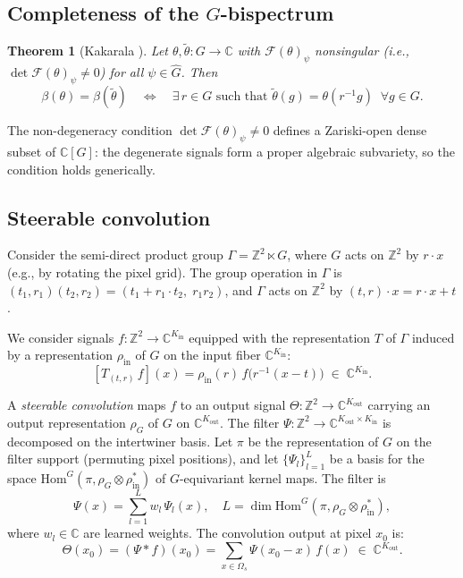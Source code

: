 \documentclass{article}
\newtheorem{theorem}{Theorem}[section]
\theoremstyle{definition}
\theoremstyle{remark}
\newcommand{\FF}{\mathcal{F}}
\newcommand{\C}{\mathbb{C}}
\newcommand{\Z}{\mathbb{Z}}
\newcommand{\Ghat}{\widehat{G}}
\newcommand{\Hom}{\mathrm{Hom}}
\begin{document}
\subsection{Completeness of the $G$-bispectrum}

\begin{theorem}[Kakarala \cite{kakarala2009}]\label{thm:completeness_prelim}
Let $\theta, \tilde{\theta} : G \to \C$ with $\FF(\theta)_\psi$ nonsingular (i.e., $\det \FF(\theta)_\psi \neq 0$) for all $\psi \in \Ghat$. Then
\[
\beta(\theta) = \beta(\tilde{\theta})
\quad\Longleftrightarrow\quad
\exists\, r \in G \text{ such that } \tilde{\theta}(g) = \theta(r^{-1}g) \;\;\forall g \in G.
\]
\end{theorem}

The non-degeneracy condition $\det \FF(\theta)_\psi \neq 0$ defines a Zariski-open dense subset of $\C[G]$: the degenerate signals form a proper algebraic subvariety, so the condition holds generically.

\subsection{Steerable convolution}\label{sec:steerable_conv}

Consider the semi-direct product group $\Gamma = \Z^2 \ltimes G$, where $G$ acts on $\Z^2$ by $r \cdot x$ (e.g., by rotating the pixel grid). The group operation in $\Gamma$ is $(t_1, r_1)(t_2, r_2) = (t_1 + r_1 \cdot t_2,\; r_1 r_2)$, and $\Gamma$ acts on $\Z^2$ by $(t, r) \cdot x = r \cdot x + t$.

We consider signals $f : \Z^2 \to \C^{K_{\mathrm{in}}}$ equipped with the representation $T$ of $\Gamma$ induced by a representation $\rho_{\mathrm{in}}$ of $G$ on the input fiber $\C^{K_{\mathrm{in}}}$:
\begin{equation}\label{eq:induced_action}
[T_{(t,r)}\, f](x) = \rho_{\mathrm{in}}(r)\, f\bigl(r^{-1}(x - t)\bigr) \;\in\; \C^{K_{\mathrm{in}}}.
\end{equation}

A \textit{steerable convolution} maps $f$ to an output signal $\Theta : \Z^2 \to \C^{K_{\mathrm{out}}}$ carrying an output representation $\rho_G$ of $G$ on $\C^{K_{\mathrm{out}}}$. The filter $\Psi : \Z^2 \to \C^{K_{\mathrm{out}} \times K_{\mathrm{in}}}$ is decomposed on the intertwiner basis. Let $\pi$ be the representation of $G$ on the filter support (permuting pixel positions), and let $\{\Psi_l\}_{l=1}^L$ be a basis for the space $\Hom^G(\pi, \rho_G \otimes \rho_{\mathrm{in}}^*)$ of $G$-equivariant kernel maps. The filter is
\begin{equation}\label{eq:filter_decomp}
\Psi(x) = \sum_{l=1}^{L} w_l\, \Psi_l(x), \quad L = \dim \Hom^G(\pi, \rho_G \otimes \rho_{\mathrm{in}}^*),
\end{equation}
where $w_l \in \C$ are learned weights. The convolution output at pixel $x_0$ is:
\begin{equation}\label{eq:conv}
\Theta(x_0) = (\Psi * f)(x_0) = \sum_{x \in \Omega_s} \Psi(x_0 - x)\, f(x) \;\in\; \C^{K_{\mathrm{out}}}.
\end{equation}
\end{document}
